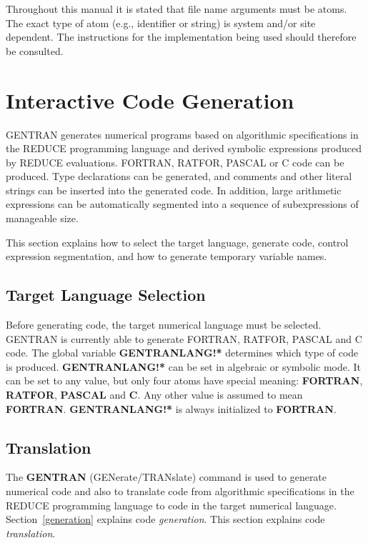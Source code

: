 Throughout this manual it is stated that file name arguments must be
atoms.  The exact type of atom (e.g., identifier or string) is
system and/or site dependent.  The instructions for the implementation
being used should therefore be consulted.

\section{Interactive Code Generation}\label{GENTRAN:inter}
GENTRAN generates numerical programs based on algorithmic specifications
in the REDUCE programming language and derived symbolic expressions
   
produced by REDUCE evaluations.  FORTRAN, RATFOR, PASCAL or C code can
be produced.  Type declarations can be generated, and comments and
other literal strings can be inserted into the generated code.  In
addition, large arithmetic expressions can be automatically segmented
into a sequence of subexpressions of manageable size.

This section explains how to select the target language, generate
code, control expression segmentation, and how to generate temporary
variable names.

\subsection{Target Language Selection}
\label{gentranlang}
Before generating code, the target numerical language must be
selected.  GENTRAN is currently able to generate FORTRAN, RATFOR,
PASCAL and C  code.  The global variable {\bf
GENTRANLANG!*} determines which type of code is produced.  {\bf
GENTRANLANG!*} can be set in algebraic or symbolic mode.  It can be
set to any value, but only four atoms have special meaning: {\bf
FORTRAN}, {\bf RATFOR}, {\bf PASCAL} and {\bf C}.  Any other value is
assumed to mean {\bf FORTRAN}.  {\bf GENTRANLANG!*} is always
initialized to {\bf FORTRAN}.


\subsection{Translation}
\label{translation}
The {\bf GENTRAN} (GENerate/TRANslate) command is used to generate
numerical code and also to translate code from algorithmic
specifications in the REDUCE programming language to code in the
target numerical language.  Section~\ref{generation} explains code
{\em generation}.  This section explains code {\em translation}.

